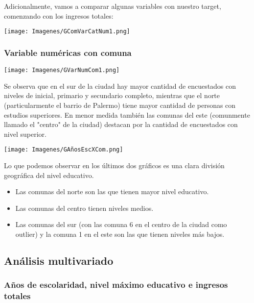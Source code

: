 \documentclass[a4paper]{article}
\begin{document}
        Adicionalmente, vamos a comparar algunas variables con nuestro target, comenzando con los ingresos totales:

        \texttt{[image: Imagenes/GComVarCatNum1.png]}
        
        \subsubsection{Variable numéricas con comuna}
        
        \texttt{[image: Imagenes/GVarNumCom1.png]}
        
        Se observa que en el sur de la ciudad hay mayor cantidad de encuestados con niveles de inicial, primario y secundario completo, mientras que el norte (particularmente el barrio de Palermo) tiene mayor cantidad de personas con estudios superiores. En menor medida también las comunas del este (comunmente llamado el "centro" de la ciudad) destacan por la cantidad de encuestados con nivel superior.
        
        \begin{center}
            \texttt{[image: Imagenes/GAñosEscXCom.png]}
        \end{center}

        Lo que podemos observar en los últimos dos gráficos es una clara división geográfica del nivel educativo.
        \begin{itemize}
            \item Las comunas del norte son las que tienen mayor nivel educativo.
            \item Las comunas del centro tienen niveles medios.
            \item Las comunas del sur (con las comuna 6 en el centro de la ciudad como outlier) y la comuna 1 en el este son las que tienen niveles más bajos.
        \end{itemize}
    
    \newpage
    
    \subsection{Análisis multivariado}
        
        \subsubsection*{Años de escolaridad, nivel máximo educativo e ingresos totales}
\end{document}

